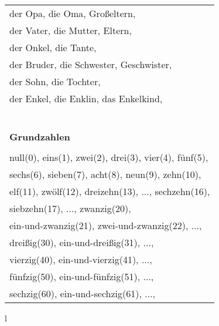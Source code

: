 \documentclass[12pt]{article}
\begin{document}
\begin{multicols}{2}
\begin{tabular}{l}
		der Opa, die Oma, Großeltern,                         \\
		der Vater, die Mutter, Eltern,                        \\
		der Onkel, die Tante,                                 \\
		der Bruder, die Schwester, Geschwister,               \\
		der Sohn, die Tochter,                                \\
		der Enkel, die Enklin, das Enkelkind,                 \\
		\\
		\\
		\\
		\\
		\\
		\\
		\textbf{Grundzahlen}                                  \\
		\hline                                                \\
		null(0), eins(1), zwei(2), drei(3), vier(4), fünf(5), \\
		sechs(6), sieben(7), acht(8), neun(9), zehn(10),      \\
		elf(11), zwölf(12), dreizehn(13), ..., sechzehn(16),  \\
		siebzehn(17), ..., zwanzig(20),                       \\
		ein-und-zwanzig(21), zwei-und-zwanzig(22), ...,       \\
		dreißig(30), ein-und-dreißig(31), ...,                \\
		vierzig(40), ein-und-vierzig(41), ...,                \\
		fünfzig(50), ein-und-fünfzig(51), ...,                \\
		sechzig(60), ein-und-sechzig(61), ...,                \\
	\end{tabular}{l}

	\begin{tabular}{l}


\end{tabular}
\end{multicols}
\end{document}
